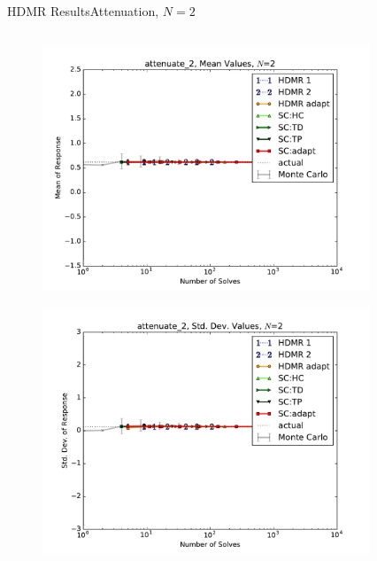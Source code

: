\documentclass{beamer}
\begin{document}
\begin{frame}{HDMR Results}{Attenuation, $N=2$}\vspace{-20pt}
 \begin{columns}
   \begin{column}{0.5\textwidth}
        \begin{figure}[h!]
          \centering
          \includegraphics[width=0.8\linewidth]{anlmodels/attenuate_2_mean_vals}
        \end{figure}
        \vspace{-20pt}
        \begin{figure}[h!]
          \centering
          \includegraphics[width=0.8\linewidth]{anlmodels/attenuate_2_var_vals}
        \end{figure}
   \end{column}
   \begin{column}{0.5\textwidth}
        \begin{figure}[h!]
          \centering

\end{figure}
\end{column}
\end{columns}
\end{frame}
\end{document}
